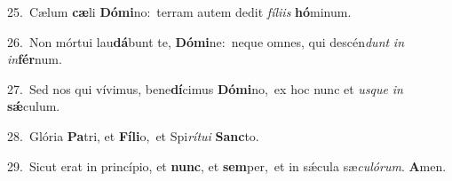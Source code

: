 {\numbfont\textcolor{\numbcolor}{25.}}~Cælum \textbf{cæ}\-li \textbf{Dó}\-\textbf{mi}no:~\star terram autem dedit \textit{fí}\-\textit{li}\textit{is} \textbf{hó}\-minum.\par
{\numbfont\textcolor{\numbcolor}{26.}}~Non mórtui lau\-\textbf{dá}\-bunt te, \textbf{Dó}\-\textbf{mi}ne:~\star neque omnes, qui descén\textit{dunt} \textit{in} \textit{in}\-\textbf{fér}num.\par
{\numbfont\textcolor{\numbcolor}{27.}}~Sed nos qui vívimus, bene\-\textbf{dí}\-cimus \textbf{Dó}\-\textbf{mi}no,~\star ex hoc nunc et \textit{us}\-\textit{que} \textit{in} \textbf{sǽ}\-culum.\par
{\numbfont\textcolor{\numbcolor}{28.}}~Glória \textbf{Pa}\-tri, et \textbf{Fí}\-\textbf{li}o,~\star et Spi\-\textit{rí}\-\textit{tu}\textit{i} \textbf{Sanc}\-to.\par
{\numbfont\textcolor{\numbcolor}{29.}}~Sicut erat in princípio, et \textbf{nunc}\-, et \textbf{sem}\-per,~\star et in sǽcula sæ\-\textit{cu}\-\textit{ló}\textit{rum}. \textbf{A}\-men.\par
